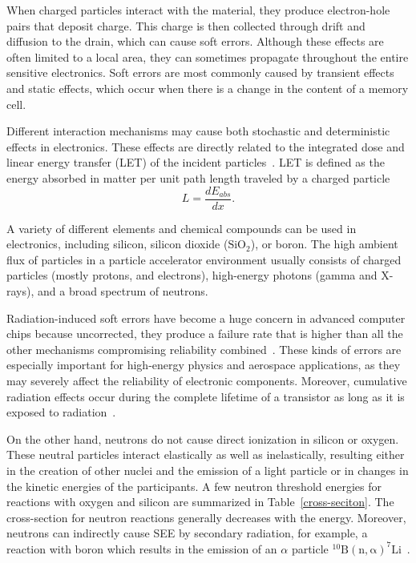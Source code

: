 When charged particles interact with the material, they produce electron-hole pairs that deposit charge. This charge is then collected through drift and diffusion to the drain, which can cause soft errors. Although these effects are often limited to a local area, they can sometimes propagate throughout the entire sensitive electronics. Soft errors are most commonly caused by transient effects and static effects, which occur when there is a change in the content of a memory cell.

Different interaction mechanisms may cause both stochastic and deterministic effects in electronics. These effects are directly related to the integrated dose and linear energy transfer (\gls{LET}) of the incident particles~\cite{electronic_system_on_module}.  LET is defined as the energy absorbed in matter per unit path length traveled by a charged particle
\begin{equation}
    L = \frac{dE_{abs}}{dx}.
\end{equation}

A variety of different elements and chemical compounds can be used in electronics, including silicon, silicon dioxide ($\mathrm{SiO}_{2}$), or boron. The high ambient flux of particles in a particle accelerator environment usually consists of charged particles (mostly protons, and electrons), high-energy photons (gamma and X-rays), and a broad spectrum of neutrons.

 Radiation-induced soft errors have become a huge concern in advanced computer chips because uncorrected, they produce a failure rate that is higher than all the other mechanisms compromising reliability combined~\cite{1545891}. These kinds of errors are especially important for high-energy physics and aerospace applications, as they may severely affect the reliability of electronic components. Moreover, cumulative radiation effects occur during the complete lifetime of a transistor as long as it is exposed to radiation~\cite{RodriguezRodriguez2020}.


On the other hand, neutrons do not cause direct ionization in silicon or oxygen. These neutral particles interact elastically as well as inelastically, resulting either in the creation of other nuclei and the emission of a light particle or in changes in the kinetic energies of the participants. A few neutron threshold energies for reactions with oxygen and silicon are summarized in Table~\ref{cross-seciton}. The cross-section for neutron reactions generally decreases with the energy. Moreover, neutrons can indirectly cause \gls{SEE} by secondary radiation, for example, a reaction with boron which results in the emission of an $\alpha$ particle $\mathrm{^{10}B(n,\alpha)^{7}Li}$~\cite{1545891,neutrons_energy,neutrons_energy_2}. 


